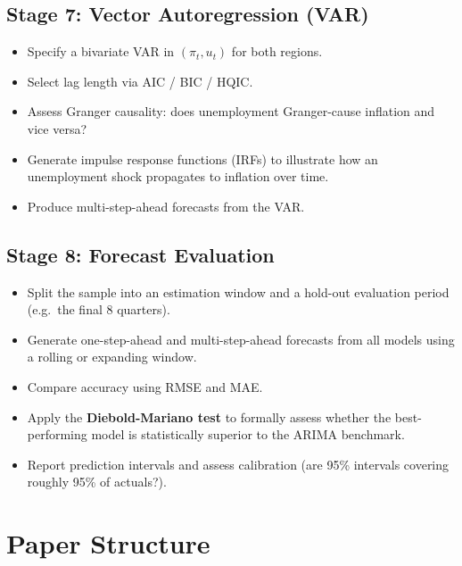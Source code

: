 \subsection{Stage 7: Vector Autoregression (VAR)}

\begin{itemize}[nosep]
    \item Specify a bivariate VAR in $(\pi_t, u_t)$ for both regions.
    \item Select lag length via AIC / BIC / HQIC.
    \item Assess Granger causality: does unemployment Granger-cause inflation
          and vice versa?
    \item Generate impulse response functions (IRFs) to illustrate how an
          unemployment shock propagates to inflation over time.
    \item Produce multi-step-ahead forecasts from the VAR.
\end{itemize}

\subsection{Stage 8: Forecast Evaluation}

\begin{itemize}[nosep]
    \item Split the sample into an estimation window and a hold-out evaluation
          period (e.g.\ the final 8 quarters).
    \item Generate one-step-ahead and multi-step-ahead forecasts from all
          models using a rolling or expanding window.
    \item Compare accuracy using RMSE and MAE.
    \item Apply the \textbf{Diebold-Mariano test} to formally assess whether
          the best-performing model is statistically superior to the ARIMA
          benchmark.
    \item Report prediction intervals and assess calibration (are 95\%
          intervals covering roughly 95\% of actuals?).
\end{itemize}

\section{Paper Structure}

